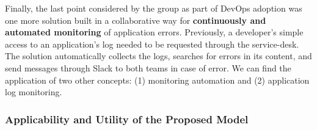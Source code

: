 {Finally, the last point considered by the group as part of DevOps adoption was
one more solution built in a collaborative way for \textbf{continuously and automated
monitoring} of application errors. Previously, a developer's simple access
to an application's log needed to be requested through the service-desk. The
solution automatically collects the logs, searches for errors in its content,
and send messages through Slack to both teams in case of error. We can find
the application of two other concepts: (1) monitoring automation and
(2) application log monitoring.

}

\subsubsection{Applicability and Utility of the Proposed Model}

